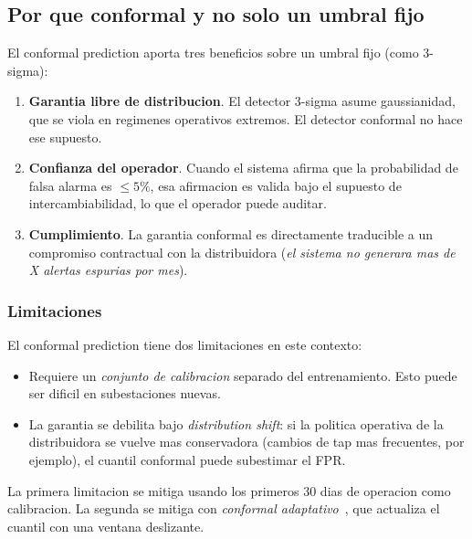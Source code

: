 \subsection{Por que conformal y no solo un umbral fijo}

El conformal prediction aporta tres beneficios sobre un umbral fijo
(como 3-sigma):

\begin{enumerate}[leftmargin=*,itemsep=2pt]
  \item \textbf{Garantia libre de distribucion}. El detector 3-sigma
        asume gaussianidad, que se viola en regimenes operativos
        extremos. El detector conformal no hace ese supuesto.

  \item \textbf{Confianza del operador}. Cuando el sistema afirma que
        la probabilidad de falsa alarma es $\le 5\%$, esa afirmacion
        es valida bajo el supuesto de intercambiabilidad, lo que el
        operador puede auditar.

  \item \textbf{Cumplimiento}. La garantia conformal es
        directamente traducible a un compromiso contractual con la
        distribuidora (\emph{el sistema no generara mas de X alertas
        espurias por mes}).
\end{enumerate}

\subsubsection{Limitaciones}

El conformal prediction tiene dos limitaciones en este contexto:

\begin{itemize}[leftmargin=*,itemsep=2pt]
  \item Requiere un \emph{conjunto de calibracion} separado del
        entrenamiento. Esto puede ser dificil en subestaciones nuevas.

  \item La garantia se debilita bajo \emph{distribution shift}: si la
        politica operativa de la distribuidora se vuelve mas
        conservadora (cambios de tap mas frecuentes, por ejemplo), el
        cuantil conformal puede subestimar el FPR.
\end{itemize}

La primera limitacion se mitiga usando los primeros 30 dias de
operacion como calibracion. La segunda se mitiga con \emph{conformal
adaptativo}~\citep{ACI-2020}, que actualiza el cuantil con una ventana
deslizante.

